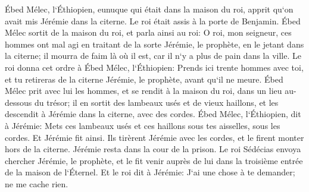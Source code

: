 \verse Ébed Mélec, l`Éthiopien, eunuque qui était dans la maison du roi, apprit qu`on avait mis Jérémie dans la citerne. Le roi était assis à la porte de Benjamin. 
\verse Ébed Mélec sortit de la maison du roi, et parla ainsi au roi: 
\verse O roi, mon seigneur, ces hommes ont mal agi en traitant de la sorte Jérémie, le prophète, en le jetant dans la citerne; il mourra de faim là où il est, car il n`y a plus de pain dans la ville. 
\verse Le roi donna cet ordre à Ébed Mélec, l`Éthiopien: Prends ici trente hommes avec toi, et tu retireras de la citerne Jérémie, le prophète, avant qu`il ne meure. 
\verse Ébed Mélec prit avec lui les hommes, et se rendit à la maison du roi, dans un lieu au-dessous du trésor; il en sortit des lambeaux usés et de vieux haillons, et les descendit à Jérémie dans la citerne, avec des cordes. 
\verse Ébed Mélec, l`Éthiopien, dit à Jérémie: Mets ces lambeaux usés et ces haillons sous tes aisselles, sous les cordes. Et Jérémie fit ainsi. 
\verse Ils tirèrent Jérémie avec les cordes, et le firent monter hors de la citerne. Jérémie resta dans la cour de la prison. 
\verse Le roi Sédécias envoya chercher Jérémie, le prophète, et le fit venir auprès de lui dans la troisième entrée de la maison de l`Éternel. Et le roi dit à Jérémie: J`ai une chose à te demander; ne me cache rien. 
